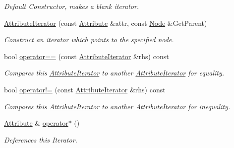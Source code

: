 \begin{DoxyCompactItemize}
\begin{DoxyCompactList}\small\item\em Default Constructor, makes a blank iterator. \item\end{DoxyCompactList}\item 
\hyperlink{classphys_1_1xml_1_1AttributeIterator_a175551035493cea0c9a56e36adcbac23}{AttributeIterator} (const \hyperlink{classphys_1_1xml_1_1Attribute}{Attribute} \&attr, const \hyperlink{classphys_1_1xml_1_1Node}{Node} \&GetParent)
\begin{DoxyCompactList}\small\item\em Construct an iterator which points to the specified node. \item\end{DoxyCompactList}\item 
bool \hyperlink{classphys_1_1xml_1_1AttributeIterator_a0eb472612438f4541ad27390ce74f6f4}{operator==} (const \hyperlink{classphys_1_1xml_1_1AttributeIterator}{AttributeIterator} \&rhs) const 
\begin{DoxyCompactList}\small\item\em Compares this \hyperlink{classphys_1_1xml_1_1AttributeIterator}{AttributeIterator} to another \hyperlink{classphys_1_1xml_1_1AttributeIterator}{AttributeIterator} for equality. \item\end{DoxyCompactList}\item 
bool \hyperlink{classphys_1_1xml_1_1AttributeIterator_a600802085aa88e41bcb2611f8044af59}{operator!=} (const \hyperlink{classphys_1_1xml_1_1AttributeIterator}{AttributeIterator} \&rhs) const 
\begin{DoxyCompactList}\small\item\em Compares this \hyperlink{classphys_1_1xml_1_1AttributeIterator}{AttributeIterator} to another \hyperlink{classphys_1_1xml_1_1AttributeIterator}{AttributeIterator} for inequality. \item\end{DoxyCompactList}\item 
\hyperlink{classphys_1_1xml_1_1Attribute}{Attribute} \& \hyperlink{classphys_1_1xml_1_1AttributeIterator_afe43d9e4a66adadf8eedc3fbcb883bcd}{operator$\ast$} ()
\begin{DoxyCompactList}\small\item\em Deferences this Iterator. \item\end{DoxyCompactList}\item 

\end{DoxyCompactItemize}
